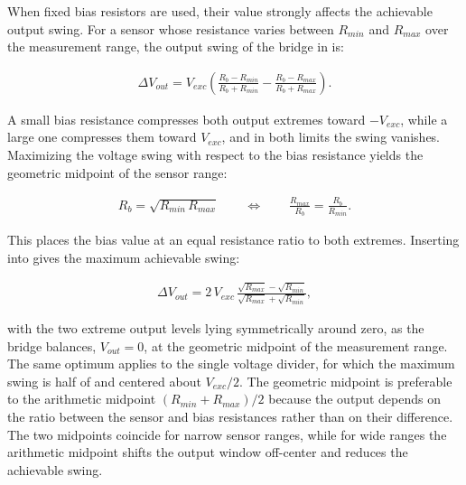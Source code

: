 When fixed bias resistors are used, their value strongly affects the achievable output swing. For a sensor whose resistance varies between $R_{\mathit{min}}$ and $R_{\mathit{max}}$ over the measurement range, the output swing of the bridge in  is:

\begin{align} \label{eq:bridge_swing}
    \Delta V_{out}=V_{exc}\left(\frac{R_b-R_{\mathit{min}}}{R_b+R_{\mathit{min}}}-\frac{R_b-R_{\mathit{max}}}{R_b+R_{\mathit{max}}}\right).
\end{align}

A small bias resistance compresses both output extremes toward $-V_{exc}$, while a large one compresses them toward $V_{exc}$, and in both limits the swing vanishes. Maximizing the voltage swing with respect to the bias resistance yields the geometric midpoint of the sensor range:

\begin{align} \label{eq:Rb_opt}
    R_b=\sqrt{R_{\mathit{min}}\,R_{\mathit{max}}}
    \qquad\Leftrightarrow\qquad
    \frac{R_{\mathit{max}}}{R_b}=\frac{R_b}{R_{\mathit{min}}}.
\end{align}

This places the bias value at an equal resistance ratio to both extremes. Inserting  into  gives the maximum achievable swing:

\begin{align} \label{eq:swing_max}
    \Delta V_{out}=2\,V_{exc}\,\frac{\sqrt{R_{\mathit{max}}}-\sqrt{R_{\mathit{min}}}}{\sqrt{R_{\mathit{max}}}+\sqrt{R_{\mathit{min}}}},
\end{align}

with the two extreme output levels lying symmetrically around zero, as the bridge balances, $V_{out}=0$, at the geometric midpoint of the measurement range. The same optimum applies to the single voltage divider, for which the maximum swing is half of  and centered about $V_{exc}/2$. The geometric midpoint is preferable to the arithmetic midpoint $\left(R_{\mathit{min}}+R_{\mathit{max}}\right)/2$ because the output depends on the ratio between the sensor and bias resistances rather than on their difference. The two midpoints coincide for narrow sensor ranges, while for wide ranges the arithmetic midpoint shifts the output window off-center and reduces the achievable swing.

